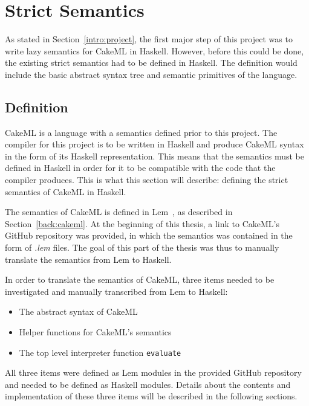 \chapter{Strict Semantics}
\label{chapter:strict}
As stated in Section~\ref{intro:project}, the first major step of this project
was to write lazy semantics for CakeML in Haskell. However, before this could be
done, the existing strict semantics had to be defined in Haskell. The definition
would include the basic abstract syntax tree and semantic primitives of the
language.

\section{Definition}
CakeML is a language with a semantics defined prior to this project.
The compiler for this project is to be written in Haskell and produce CakeML
syntax in the form of its Haskell representation. This means that
the semantics must be defined in Haskell in order for it to be compatible with
the code that the compiler produces. This is
what this section will describe: defining the strict semantics of CakeML in
Haskell.

The semantics of CakeML is defined in Lem~\cite{Lem33:online}, as described in
Section~\ref{back:cakeml}. At the beginning of this thesis, a link to CakeML's
GitHub repository was provided, in which the semantics was contained in the form
of \textit{.lem} files. The goal of this part of the thesis was thus to manually
translate the semantics from Lem to Haskell.

In order to translate the semantics of CakeML, three items needed to be
investigated and manually transcribed from Lem to Haskell:
\begin{itemize}
\item The abstract syntax of CakeML
\item Helper functions for CakeML's semantics
\item The top level interpreter function \texttt{evaluate}
\end{itemize}

\noindent All three items were defined as Lem modules in the provided GitHub
repository and needed to be defined as Haskell modules.
Details about the contents and implementation of these three items
will be described in the following sections.

